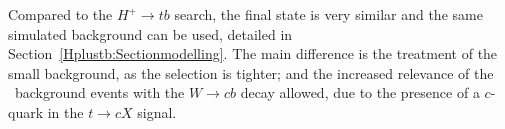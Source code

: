 Compared to the $H^+\to tb$ search, the final state is very similar and the same simulated background can be used, detailed in Section~\ref{Hplustb:Sectionmodelling}. The main difference is the treatment of the small background, as the selection is tighter; and the increased relevance of the \ttbar\ background events with the $W\to cb$ decay allowed, due to the presence of a $c$-quark in the $t\to cX$ signal.\\


